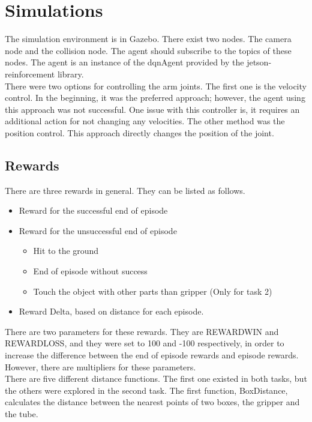 \documentclass[10pt,journal,compsoc]{IEEEtran}
\begin{document}
\section{Simulations}
The simulation environment is in Gazebo. There exist two nodes. The camera node and the collision node. The agent should subscribe to the topics of these nodes. The agent is an instance of the dqnAgent provided by the jetson-reinforcement library.\\
There were two options for controlling the arm joints. The first one is the velocity control. In the beginning, it was the preferred approach; however, the agent using this approach was not successful. One issue with this controller is, it requires an additional action for not changing any velocities. The other method was the position control. This approach directly changes the position of the joint.\\
\subsection{Rewards}
There are three rewards in general. They can be listed as follows.
\begin{itemize}
\item Reward for the successful end of episode
\item Reward for the unsuccessful end of episode
   \begin{itemize}
     \item Hit to the ground
     \item End of episode without success
     \item Touch the object with other parts than gripper (Only for task 2)
   \end{itemize}
\item Reward Delta, based on distance for each episode.
\end{itemize}
There are two parameters for these rewards. They are REWARD\textunderscore WIN and REWARD\textunderscore LOSS, and they were set to 100 and -100 respectively, in order to increase the difference between the end of episode rewards and episode rewards. However, there are multipliers for these parameters.\\
There are five different distance functions. The first one existed in both tasks, but the others were explored in the second task. The first function, BoxDistance, calculates the distance between the nearest points of two boxes, the gripper and the tube.\\
\end{document}
